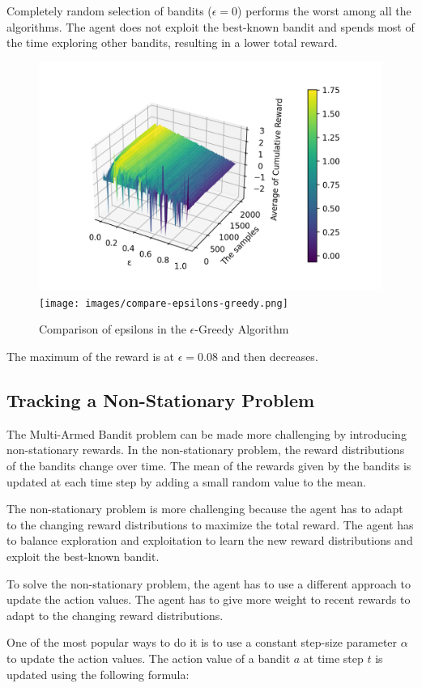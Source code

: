 Completely random selection of bandits ($\epsilon=0$) performs the worst among all the algorithms. The agent does not exploit the best-known bandit and spends most of the time exploring other bandits, resulting in a lower total reward.

\begin{figure}[h!]
    \centering
    \includegraphics[width=0.49\linewidth]{images/3d-compare-epsilon-greedy.png}
    \texttt{[image: images/compare-epsilons-greedy.png]}
    \caption{Comparison of epsilons in the $\epsilon$-Greedy Algorithm}
    \label{fig:epsilon_greedy_optimistic}
\end{figure}

The maximum of the reward is at $\epsilon=0.08$ and then decreases.

\subsection{Tracking a Non-Stationary Problem}

The Multi-Armed Bandit problem can be made more challenging by introducing non-stationary rewards. In the non-stationary problem, the reward distributions of the bandits change over time. The mean of the rewards given by the bandits is updated at each time step by adding a small random value to the mean.

The non-stationary problem is more challenging because the agent has to adapt to the changing reward distributions to maximize the total reward. The agent has to balance exploration and exploitation to learn the new reward distributions and exploit the best-known bandit.

To solve the non-stationary problem, the agent has to use a different approach to update the action values. The agent has to give more weight to recent rewards to adapt to the changing reward distributions.

One of the most popular ways to do it is to use a constant step-size parameter $\alpha$ to update the action values. The action value of a bandit $a$ at time step $t$ is updated using the following formula:

